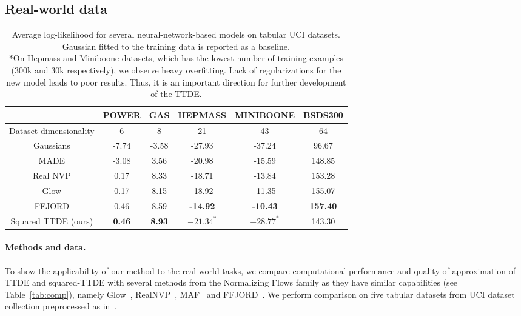 \documentclass[accepted]{uai2021}
\begin{document}
  \subsection{Real-world data}
  \label{subsec:real-world}

  \begin{table*}[h]
    \centering
    \caption{Average log-likelihood for several neural-network-based models on tabular UCI datasets. Gaussian fitted to the training data is reported as a baseline. \\
    *On Hepmass and Miniboone datasets, which has the lowest number of training examples (300k and 30k respectively), we observe heavy overfitting. Lack of regularizations for the new model leads to poor results. Thus, it is an important direction for further development of the TTDE. }
    \label{tab:sqrttde-results}
    \begin{tabular}{cccccc}
      \toprule %
      & POWER & GAS & HEPMASS & MINIBOONE & BSDS300 \\
      \midrule %
      Dataset dimensionality & 6 &  8 & 21 & 43 & 64 \\
      \midrule
      Gaussians & -7.74 & -3.58 & -27.93 & -37.24 &  96.67 \\
      MADE      & -3.08 &  3.56 & -20.98 & -15.59 & 148.85 \\
      Real NVP  &  0.17 &  8.33 & -18.71 & -13.84 & 153.28 \\
      Glow      &  0.17 &  8.15 & -18.92 & -11.35 & 155.07 \\
      FFJORD    &  0.46 &  8.59 & \bfseries -14.92 & \bfseries -10.43 & \bfseries 157.40 \\
      \midrule
      Squared TTDE (ours) & \bfseries 0.46 & \bfseries 8.93 & $-21.34^*$ & $-28.77^*$ & 143.30 \\
      \bottomrule %
    \end{tabular}
  \end{table*}

  \paragraph{Methods and data.}
  To show the applicability of our method to the real-world tasks, we compare computational performance and quality of approximation of TTDE and squared-TTDE with several methods from the Normalizing Flows family as they have similar capabilities (see Table~\ref{tab:comp}), namely Glow~\citep{Kingma2018}, RealNVP~\citep{Dinh2016}, MAF~\citep{Papamakarios2017} and FFJORD~\citep{Grathwohl2018}. We perform comparison on five tabular datasets from UCI dataset collection preprocessed as in~\cite{papamakarios2017masked}.
\end{document}

